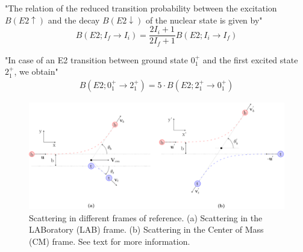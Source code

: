 \documentclass[twoside,english]{uiofysmaster/uiofysmaster}
\begin{document}
\bigskip

"The relation of the reduced transition probability between the excitation $B(E2 \uparrow)$ and the decay $B(E2 \downarrow)$ of the nuclear state is given by"
\begin{equation}
	B(E2; I_f \rightarrow I_i) = \frac{2I_i + 1}{2I_f + 1} B(E2; I_i \rightarrow I_f)
\end{equation}

\bigskip

"In case of an E2 transition between ground state $0_1^+$ and the first excited state $2_1^+$, we obtain"
\begin{align}
	B(E2; 0_1^+ \rightarrow 2_1^+) = 5 \cdot B(E2; 2_1^+ \rightarrow 0_1^+)
\end{align} 


\newpage


\begin{figure}[htb]
	\centering
	\includegraphics[width=\textwidth]{Images/scattering.png}
	\caption{Scattering in different frames of reference.
	(a) Scattering in the LABoratory (LAB) frame. 
	(b) Scattering in the Center of Mass (CM) frame. 
	See text for more information.}
	\label{fig:scattering}
\end{figure}

%		
%		
\end{document}
